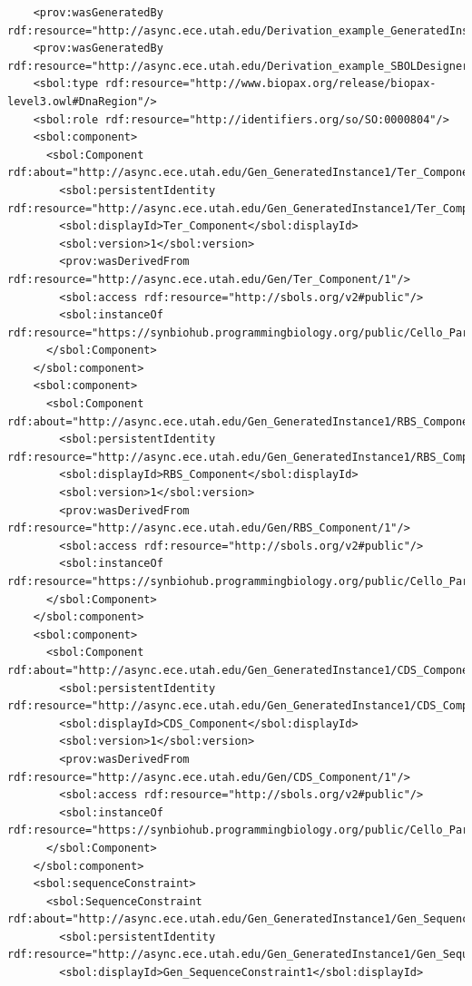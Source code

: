 \begin{lstlisting}
    <prov:wasGeneratedBy rdf:resource="http://async.ece.utah.edu/Derivation_example_GeneratedInstance21_SBOLDesignerActivity/1"/>
    <prov:wasGeneratedBy rdf:resource="http://async.ece.utah.edu/Derivation_example_SBOLDesignerActivity/1"/>
    <sbol:type rdf:resource="http://www.biopax.org/release/biopax-level3.owl#DnaRegion"/>
    <sbol:role rdf:resource="http://identifiers.org/so/SO:0000804"/>
    <sbol:component>
      <sbol:Component rdf:about="http://async.ece.utah.edu/Gen_GeneratedInstance1/Ter_Component/1">
        <sbol:persistentIdentity rdf:resource="http://async.ece.utah.edu/Gen_GeneratedInstance1/Ter_Component"/>
        <sbol:displayId>Ter_Component</sbol:displayId>
        <sbol:version>1</sbol:version>
        <prov:wasDerivedFrom rdf:resource="http://async.ece.utah.edu/Gen/Ter_Component/1"/>
        <sbol:access rdf:resource="http://sbols.org/v2#public"/>
        <sbol:instanceOf rdf:resource="https://synbiohub.programmingbiology.org/public/Cello_Parts/L3S3P31/1"/>
      </sbol:Component>
    </sbol:component>
    <sbol:component>
      <sbol:Component rdf:about="http://async.ece.utah.edu/Gen_GeneratedInstance1/RBS_Component/1">
        <sbol:persistentIdentity rdf:resource="http://async.ece.utah.edu/Gen_GeneratedInstance1/RBS_Component"/>
        <sbol:displayId>RBS_Component</sbol:displayId>
        <sbol:version>1</sbol:version>
        <prov:wasDerivedFrom rdf:resource="http://async.ece.utah.edu/Gen/RBS_Component/1"/>
        <sbol:access rdf:resource="http://sbols.org/v2#public"/>
        <sbol:instanceOf rdf:resource="https://synbiohub.programmingbiology.org/public/Cello_Parts/P1/1"/>
      </sbol:Component>
    </sbol:component>
    <sbol:component>
      <sbol:Component rdf:about="http://async.ece.utah.edu/Gen_GeneratedInstance1/CDS_Component/1">
        <sbol:persistentIdentity rdf:resource="http://async.ece.utah.edu/Gen_GeneratedInstance1/CDS_Component"/>
        <sbol:displayId>CDS_Component</sbol:displayId>
        <sbol:version>1</sbol:version>
        <prov:wasDerivedFrom rdf:resource="http://async.ece.utah.edu/Gen/CDS_Component/1"/>
        <sbol:access rdf:resource="http://sbols.org/v2#public"/>
        <sbol:instanceOf rdf:resource="https://synbiohub.programmingbiology.org/public/Cello_Parts/PhlF/1"/>
      </sbol:Component>
    </sbol:component>
    <sbol:sequenceConstraint>
      <sbol:SequenceConstraint rdf:about="http://async.ece.utah.edu/Gen_GeneratedInstance1/Gen_SequenceConstraint1/1">
        <sbol:persistentIdentity rdf:resource="http://async.ece.utah.edu/Gen_GeneratedInstance1/Gen_SequenceConstraint1"/>
        <sbol:displayId>Gen_SequenceConstraint1</sbol:displayId>

\end{lstlisting}
